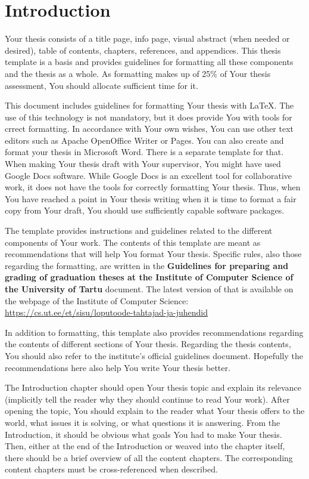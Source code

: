 \section{Introduction} \label{Introduction_OLD}

Your thesis consists of a title page, info page, visual abstract (when needed or desired), table of contents, chapters, references, and appendices. This thesis template is a basis and provides guidelines for formatting all these components and the thesis as a whole. As formatting makes up of 25\% of Your thesis assessment, You should allocate sufficient time for it.

This document includes guidelines for formatting Your thesis with LaTeX. The use of this technology is not mandatory, but it does provide You with tools for crrect formatting. In accordance with Your own wishes, You can use other text editors such as Apache OpenOffice Writer or Pages. You can also create and format your thesis in Microsoft Word. There is a separate template for that. When making Your thesis draft with Your supervisor, You might have used Google Docs software. While Google Docs is an excellent tool for collaborative work, it does not have the tools for correctly formatting Your thesis. Thus, when You have reached a point in Your thesis writing when it is time to format a fair copy from Your draft, You should use sufficiently capable software packages.

The template provides instructions and guidelines related to the different components of Your work. The contents of this template are meant as recommendations that will help You format Your thesis. Specific rules, also those regarding the formatting, are written in the \textbf{Guidelines for preparing and grading of graduation theses at the Institute of Computer Science of the University of Tartu} document. The latest version of that is available on the webpage of the Institute of Computer Science: \url{https://cs.ut.ee/et/sisu/loputoode-tahtajad-ja-juhendid}


In addition to formatting, this template also provides recommendations regarding the contents of different sections of Your thesis. Regarding the thesis contents, You should also refer to the institute’s official guidelines document. Hopefully the recommendations here also help You write Your thesis better.

The Introduction chapter should open Your thesis topic and explain its relevance (implicitly tell the reader why they should continue to read Your work). After opening the topic, You should explain to the reader what Your thesis offers to the world, what issues it is solving, or what questions it is answering. From the Introduction, it should be obvious what goals You had to make Your thesis. Then, either at the end of the Introduction or weaved into the chapter itself, there should be a brief overview of all the content chapters. The corresponding content chapters must be cross-referenced when described.

